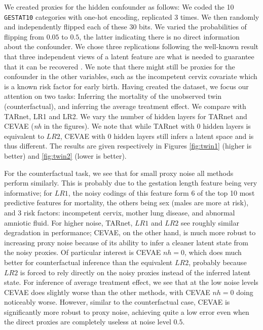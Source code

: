 We created proxies for the hidden confounder as follows: We coded the 10 \texttt{GESTAT10}  categories with one-hot encoding, replicated 3 times. We then randomly and independently flipped each of these 30 bits. We varied the probabilities of flipping from $0.05$ to $0.5$,  the latter indicating there is no direct information about the confounder. We chose three replications following the well-known result that three independent views of a latent feature are what is needed to guarantee that it can be recovered \citep{kruskal1976more,allman2009identifiability,anandkumar2014tensor}. We note that there might still be proxies for the confounder in the other variables, such as the incompetent cervix covariate which is a known risk factor for early birth.
Having created the dataset, we focus our attention on two tasks: Inferring the mortality of the unobserved twin (counterfactual), and inferring the average treatment effect. We compare with TARnet, LR1 and LR2. We vary the number of hidden layers for TARnet and CEVAE (\emph{nh} in the figures). We note that while TARnet with 0 hidden layers is equivalent to $LR2$, CEVAE with 0 hidden layers still infers a latent space and is thus different. The results are given respectively in Figures \ref{fig:twin1} (higher is better) and \ref{fig:twin2} (lower is better).

For the counterfactual task, we see that for small proxy noise all methods perform similarly. This is probably due to the gestation length feature being very informative; for $LR1$, the noisy codings of this feature form 6 of the top 10 most predictive features for mortality, the others being sex (males are more at risk), and 3 risk factors: incompetent cervix, mother lung disease, and abnormal amniotic fluid.
For higher noise, TARnet, $LR1$ and $LR2$ see roughly similar degradation in performance;  CEVAE, on the other hand, is much more robust to increasing proxy noise because of its ability to infer a cleaner latent state from the noisy proxies. Of particular interest is CEVAE $nh=0$, which does much better for counterfactual inference than the equivalent $LR2$, probably because $LR2$ is forced to rely directly on the noisy proxies instead of the inferred latent state. 
For inference of average treatment effect, we see that at the low noise levels CEVAE does slightly worse than the other methods, with CEVAE $nh=0$ doing noticeably worse. However, similar to the counterfactual case, CEVAE is significantly more robust to proxy noise, achieving quite a low error even when the direct proxies are completely useless at noise level $0.5$.

